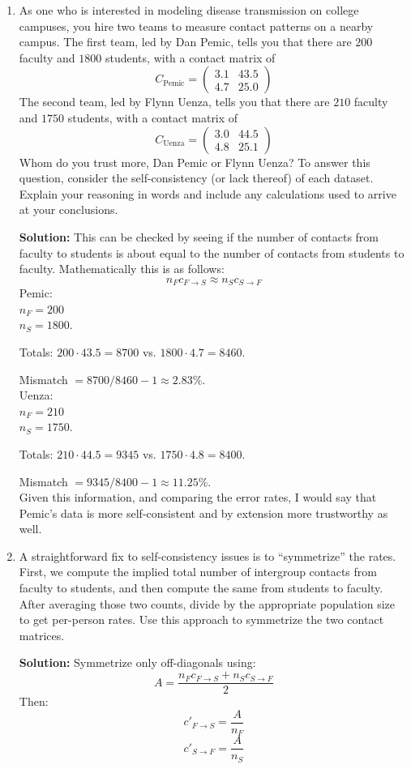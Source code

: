 \documentclass[11pt]{article}
\newenvironment{solution}{\par\noindent\begingroup\color{BrickRed}\textbf{Solution:} }{\par\endgroup}
\begin{document}
\begin{enumerate}
\begin{enumerate}[label=\alph*.]
	\item As one who is interested in modeling disease transmission on college campuses, you hire two teams to measure contact patterns on a nearby campus. The first team, led by Dan Pemic, tells you that there are $200$ faculty and $1800$ students, with a contact matrix of 
	$$C_\text{Pemic} = \begin{pmatrix}
		3.1 & 43.5 \\
		4.7 & 25.0
	\end{pmatrix}$$
The second team, led by Flynn Uenza, tells you that there are $210$ faculty and $1750$ students, with a contact matrix of
	$$C_\text{Uenza} = \begin{pmatrix}
		3.0 & 44.5 \\
		4.8 & 25.1
		\end{pmatrix}
	$$
Whom do you trust more, Dan Pemic or Flynn Uenza? To answer this question, consider the self-consistency (or lack thereof) of each dataset. Explain your reasoning in words and include any calculations used to arrive at your conclusions. 

\begin{solution}
This can be checked by seeing if the number of contacts from faculty to students is about equal to the number of contacts from students to faculty. 
Mathematically this is as follows:
$$n_F c_{F\to S} \approx n_S c_{S\to F}$$
Pemic: \\
$n_F = 200$ \\
$n_S = 1800$.

Totals: $200 \cdot 43.5 = 8700$ vs. $1800 \cdot 4.7 = 8460$.

Mismatch $ = 8700 / 8460 - 1 \approx 2.83 \%$. \\

Uenza: \\
$n_F = 210$ \\
$n_S = 1750$.

Totals: $210 \cdot 44.5 = 9345$ vs. $1750 \cdot 4.8 = 8400$.

Mismatch $ = 9345 / 8400 - 1 \approx 11.25 \%$. \\

Given this information, and comparing the error rates, I would say that Pemic's data is more self-consistent and by extension more trustworthy as well.
\end{solution}

\item A straightforward fix to self-consistency issues is to ``symmetrize'' the rates. First, we compute the implied total number of intergroup contacts from faculty to students, and then compute the same from students to faculty. After averaging those two counts, divide by the appropriate population size to get per-person rates. Use this approach to symmetrize the two contact matrices. 
\begin{solution}
Symmetrize only off-diagonals using: 
$$A=\frac{n_F c_{F\to S} + n_S c_{S\to F}}{2}$$
Then:
$$c'_{F\to S}=\frac{A}{n_F}$$
$$c'_{S\to F}=\frac{A}{n_S}$$


\end{solution}
\end{enumerate}
\end{enumerate}
\end{document}
